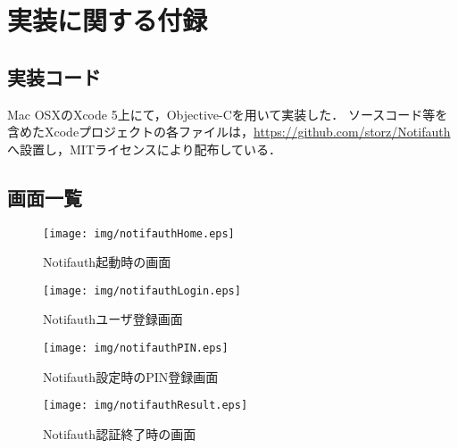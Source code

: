 \appendix
\chapter{実装に関する付録}\label{apdx:app}
\section{実装コード}\label{apdx:code}
Mac OSXのXcode 5上にて，Objective-Cを用いて実装した．
ソースコード等を含めたXcodeプロジェクトの各ファイルは，\url{https://github.com/storz/Notifauth}へ設置し，MITライセンスにより配布している．

\section{画面一覧}\label{apdx:screen}
\begin{figure}[ht]
  \begin{minipage}{0.5\hsize}
    \begin{center}
      \texttt{[image: img/notifauthHome.eps]}
    \end{center}
    \caption{Notifauth起動時の画面}
    \label{fig:notifauthHome}
  \end{minipage}
  \begin{minipage}{0.5\hsize}
    \begin{center}
      \texttt{[image: img/notifauthLogin.eps]}
    \end{center}
    \caption{Notifauthユーザ登録画面}
    \label{fig:notifauthLogin}
  \end{minipage}
\end{figure}

\begin{figure}[ht]
  \begin{minipage}{0.5\hsize}
    \begin{center}
      \texttt{[image: img/notifauthPIN.eps]}
    \end{center}
    \caption{Notifauth設定時のPIN登録画面}
    \label{fig:notifauthPIN}
  \end{minipage}
  \begin{minipage}{0.5\hsize}
    \begin{center}
      \texttt{[image: img/notifauthResult.eps]}
    \end{center}
    \caption{Notifauth認証終了時の画面}
    \label{fig:notifauthResult}
  \end{minipage}
\end{figure}

